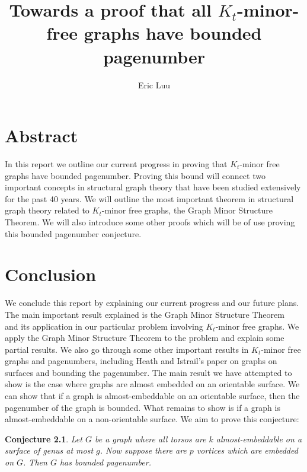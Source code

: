 \documentclass[]{report}
\title{Towards a proof that all \(K_t\)-minor-free graphs have bounded pagenumber}
\author{Eric Luu}
\newtheorem{conjecture}[theorem]{Conjecture}
\theoremstyle{definition}
\numberwithin{theorem}{section}
\numberwithin{equation}{section}
\begin{document}
\maketitle
\listoftodos

\chapter{Abstract}\label{abstract}
In this report we outline our current progress in proving that \(K_t\)-minor free graphs have bounded pagenumber. Proving this bound will connect two important concepts in structural graph theory that have been studied extensively for the past 40 years. We will outline the most important theorem in structural graph theory related to \(K_t\)-minor free graphs, the Graph Minor Structure Theorem. We will also introduce some other proofs which will be of use proving this bounded pagenumber conjecture.

\setcounter{tocdepth}{1}
\tableofcontents










\chapter{Conclusion}\label{chap:conclusion}
We conclude this report by explaining our current progress and our future plans.
The main important result explained is the Graph Minor Structure Theorem~\cite{robertsonGraphMinorsXVI2003} and its application in our particular problem involving \(K_t\)-minor free graphs. We apply the Graph Minor Structure Theorem to the problem and explain some partial results.
We also go through some other important results in \(K_t\)-minor free graphs and pagenumbers, including Heath and Istrail's \cite{heathPagenumberGenusGraphs1992} paper on graphs on surfaces and bounding the pagenumber.
The main result we have attempted to show is the case where graphs are almost embedded on an orientable surface. We can show that if a graph is almost-embeddable on an orientable surface, then the pagenumber of the graph is bounded.
What remains to show is if a graph is almost-embeddable on a non-orientable surface.
We aim to prove this conjecture:
\begin{conjecture}
	Let $G$ be a graph where all torsos are $k$ almost-embeddable on a surface of genus at most $g$. Now suppose there are $p$ vortices which are embedded on $G$. Then $G$ has bounded pagenumber.
\end{conjecture}
\end{document}
